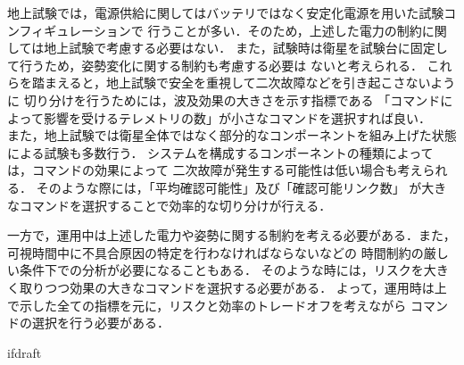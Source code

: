 \documentclass[11pt]{jsreport}
\begin{document}
地上試験では，電源供給に関してはバッテリではなく安定化電源を用いた試験コンフィギュレーションで
行うことが多い．そのため，上述した電力の制約に関しては地上試験で考慮する必要はない．
また，試験時は衛星を試験台に固定して行うため，姿勢変化に関する制約も考慮する必要は
ないと考えられる．
これらを踏まえると，地上試験で安全を重視して二次故障などを引き起こさないように
切り分けを行うためには，波及効果の大きさを示す指標である
「コマンドによって影響を受けるテレメトリの数」が小さなコマンドを選択すれば良い．\\
また，地上試験では衛星全体ではなく部分的なコンポーネントを組み上げた状態による試験も多数行う．
システムを構成するコンポーネントの種類によっては，コマンドの効果によって
二次故障が発生する可能性は低い場合も考えられる．
そのような際には，「平均確認可能性」及び「確認可能リンク数」
が大きなコマンドを選択することで効率的な切り分けが行える．


一方で，運用中は上述した電力や姿勢に関する制約を考える必要がある．また，
可視時間中に不具合原因の特定を行わなければならないなどの
時間制約の厳しい条件下での分析が必要になることもある．
そのような時には，リスクを大きく取りつつ効果の大きなコマンドを選択する必要がある．
よって，運用時は上で示した全ての指標を元に，リスクと効率のトレードオフを考えながら
コマンドの選択を行う必要がある．

\expandafter\ifx\csname ifdraft\endcsname\relax
  
\end{document}

